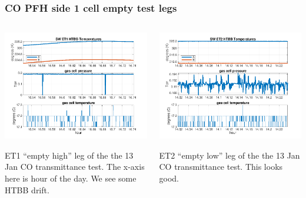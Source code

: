 \documentclass[10pt]{beamer}
\begin{document}
\begin{frame}
\frametitle{CO PFH side 1 cell empty test legs}
\begin{columns}[t]
\begin{column}{0.5\textwidth}
  \begin{centering}
  \includegraphics[width=\textwidth]{harvest_01-12/01-13_SW_ET1.png}
  \end{centering}\vspace{3mm}

  ET1 ``empty high'' leg of the the 13 Jan CO transmittance test.
  The x-axis here is hour of the day.  We see some HTBB drift.

\end{column}
\begin{column}{0.5\textwidth}  
  \begin{centering}
  \includegraphics[width=\textwidth]{harvest_01-12/01-13_SW_ET2.png}
  \end{centering}\vspace{3mm}

  ET2 ``empty low'' leg of the the 13 Jan CO transmittance test.
  This looks good.  

\end{column}
\end{columns}
\end{frame}
\end{document}
